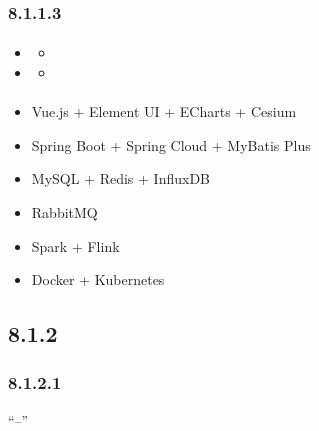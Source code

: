 \hypertarget{section-34}{%
\subsubsection{8.1.1.3}\label{section-34}}

\hypertarget{section-35}{%
\paragraph{}\label{section-35}}

\begin{itemize}
\item
  \begin{itemize}
  \tightlist
  \item
  \end{itemize}
\item
  \begin{itemize}
  \tightlist
  \item
  \end{itemize}
\end{itemize}

\hypertarget{section-36}{%
\paragraph{}\label{section-36}}

\begin{itemize}
\tightlist
\item
  \important{}Vue.js + Element UI + ECharts + Cesium
\item
  \important{}Spring Boot + Spring Cloud + MyBatis Plus
\item
  \important{}MySQL + Redis + InfluxDB
\item
  \important{}RabbitMQ
\item
  \important{}Spark + Flink
\item
  \important{}Docker + Kubernetes
\end{itemize}

\hypertarget{section-37}{%
\subsection{8.1.2}\label{section-37}}

\hypertarget{section-38}{%
\subsubsection{8.1.2.1}\label{section-38}}

``--''

